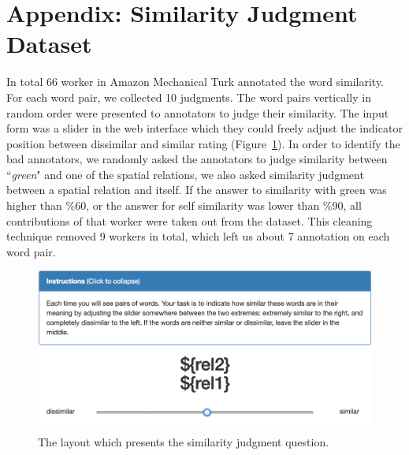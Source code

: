 \section{Appendix: Similarity Judgment Dataset}\label{splu2019:sec:similarity_dataset}
In total 66 worker in Amazon Mechanical Turk annotated the word similarity. For each word pair, we collected 10 judgments. The word pairs vertically in random order were presented to annotators to judge their similarity. The input form was a slider in the web interface which they could freely adjust the indicator position between dissimilar and similar rating (Figure~\ref{splu2019:fig:screenshot}). In order to identify the bad annotators, we randomly asked the annotators to judge similarity between ``\emph{green}" and one of the spatial relations, we also asked similarity judgment between a spatial relation and itself. If the answer to similarity with green was higher than \%60, or the answer for self similarity was lower than \%90, all contributions of that worker were taken out from the dataset. This cleaning technique removed 9 workers in total, which left us about 7 annotation on each word pair.

\begin{figure}[h!]
	\begin{center}
		\includegraphics[width=0.85\linewidth]{studies/splu2019/figures/amt_layout_screenshot.png}
		\caption{The layout which presents the similarity judgment question.}
		\label{splu2019:fig:screenshot}
	\end{center}
\end{figure}

\clearpage



